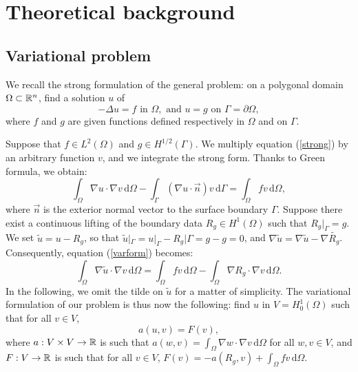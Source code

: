 \newpage
\section{Theoretical background}\label{theory}



\subsection{Variational problem}
We recall the strong formulation of the general problem: on a polygonal domain $\Omega \subset \mathbb{R}^n$, find a solution $u$ of 
\begin{equation}\label{strong}
-\Delta u = f \text{ in } \Omega, \text{ and } u = g \text{ on } \Gamma = \partial \Omega,
\end{equation}
where $f$ and $g$ are given functions defined respectively in $\Omega$ and on $\Gamma$. 

Suppose that $f\in L^2(\Omega)$ and $g\in H^{1/2}(\Gamma)$. We multiply equation (\ref{strong}) by an arbitrary function $v$, and we integrate the strong form. Thanks to Green formula, we obtain:
\begin{equation}\label{varform} \int_\Omega \nabla u\cdot \nabla v \, \mathrm{d}\Omega- \int_\Gamma (\nabla u \cdot \vec{n}) v \, \mathrm{d}\Gamma = \int_\Omega fv \, \mathrm{d}\Omega, 
\end{equation}
where $\vec{n}$ is the exterior normal vector to the surface boundary $\Gamma$. Suppose there exist a continuous lifting of the boundary data $R_g \in H^1(\Omega)$ such that  $R_g|_{\Gamma} = g$. We set $\tilde{u} = u - R_g$, so that $\tilde{u}|_\Gamma = u|_\Gamma - R_g|\Gamma = g-g = 0$, and $\nabla \tilde{u} = \nabla \tilde{u} - \nabla \tilde{R_g}$. Consequently, equation (\ref{varform}) becomes: 
\begin{equation*}
\int_\Omega \nabla \tilde{u}\cdot \nabla v \, \mathrm{d}\Omega = \int_\Omega fv \, \mathrm{d}\Omega -	 \int_\Omega \nabla R_g \cdot \nabla v \, \mathrm{d}\Omega.
\end{equation*}
In the following, we omit the tilde on $\tilde{u}$ for a matter of simplicity. The variational formulation of our problem is thus now the following: find $u$ in $V=H^1_0(\Omega)$ such that for all $v\in V$, 
\begin{equation}\label{weak}
a(u,v) = F(v),
\end{equation}
where $a : V \times V \rightarrow \mathbb{R}$ is such that $a(w,v) = \int_\Omega \nabla w\cdot \nabla v \, \mathrm{d}\Omega$ for all $w,v\in V$, and $F:V\rightarrow\mathbb{R}$ is such that for all $v\in V$, $F(v) = -a(R_g, v) + \int_\Omega fv \, \mathrm{d}\Omega$.

